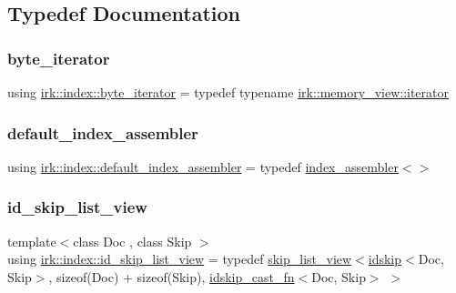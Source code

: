 \subsection{Typedef Documentation}
\mbox{\label{namespaceirk_1_1index_a4089fad8418d09bec3dd2a7ff91d1cea}} 
\subsubsection{\texorpdfstring{byte\+\_\+iterator}{byte\_iterator}}
{\footnotesize\ttfamily using \mbox{\hyperlink{namespaceirk_1_1index_a4089fad8418d09bec3dd2a7ff91d1cea}{irk\+::index\+::byte\+\_\+iterator}} = typedef typename \mbox{\hyperlink{classirk_1_1memory__view_1_1iterator}{irk\+::memory\+\_\+view\+::iterator}}}

\mbox{\label{namespaceirk_1_1index_a0f1c105dfd7dd3ada51c4c2eb2b6850e}} 
\subsubsection{\texorpdfstring{default\+\_\+index\+\_\+assembler}{default\_index\_assembler}}
{\footnotesize\ttfamily using \mbox{\hyperlink{namespaceirk_1_1index_a0f1c105dfd7dd3ada51c4c2eb2b6850e}{irk\+::index\+::default\+\_\+index\+\_\+assembler}} = typedef \mbox{\hyperlink{classirk_1_1index_1_1index__assembler}{index\+\_\+assembler}}$<$$>$}

\mbox{\label{namespaceirk_1_1index_ab41287bdb0b0d461d4aa1ec2bda99ddc}} 
\subsubsection{\texorpdfstring{id\+\_\+skip\+\_\+list\+\_\+view}{id\_skip\_list\_view}}
{\footnotesize\ttfamily template$<$class Doc , class Skip $>$ \\
using \mbox{\hyperlink{namespaceirk_1_1index_ab41287bdb0b0d461d4aa1ec2bda99ddc}{irk\+::index\+::id\+\_\+skip\+\_\+list\+\_\+view}} = typedef \mbox{\hyperlink{classirk_1_1index_1_1skip__list__view}{skip\+\_\+list\+\_\+view}}$<$\mbox{\hyperlink{structirk_1_1index_1_1idskip}{idskip}}$<$Doc, Skip$>$, sizeof(Doc) + sizeof(Skip), \mbox{\hyperlink{structirk_1_1index_1_1idskip__cast__fn}{idskip\+\_\+cast\+\_\+fn}}$<$Doc, Skip$>$ $>$}



